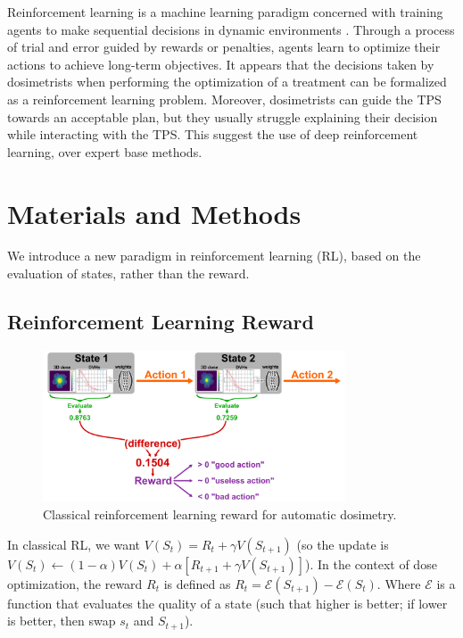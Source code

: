 Reinforcement learning is a machine learning paradigm concerned with training agents to make sequential decisions in dynamic environments \cite{brooks_what_2021}.
Through a process of trial and error guided by rewards or penalties, agents learn to optimize their actions to achieve long-term objectives.
It appears that the decisions taken by dosimetrists when performing the optimization of a treatment can be formalized as a reinforcement learning problem.
Moreover, dosimetrists can guide the TPS towards an acceptable plan, but they usually struggle explaining their decision while interacting with the TPS.
This suggest the use of deep reinforcement learning, over expert base methods.

\section{Materials and Methods}
We introduce a new paradigm in reinforcement learning (RL), based on the evaluation of states, rather than the reward.

\subsection{Reinforcement Learning Reward}

\begin{figure}
	\centering
	\includegraphics[width=0.8\textwidth]{reward.pdf}
	\caption{Classical reinforcement learning reward for automatic dosimetry.}
	\label{fig:reward_fig}
\end{figure}

In classical RL, we want $V(S_t) = R_t + \gamma V(S_{t+1})$
(so the update is $V(S_t) \leftarrow (1-\alpha) V(S_t) + \alpha \left[ R_{t+1} + \gamma V(S_{t+1}) \right]$).
In the context of dose optimization, the reward $R_t$ is defined as $R_t = \mathcal{E}(S_{t+1}) - \mathcal{E}(S_t)$.
Where $\mathcal{E}$ is a function that evaluates the quality of a state (such that higher is better; if lower is better, then swap $s_t$ and $S_{t+1}$).

